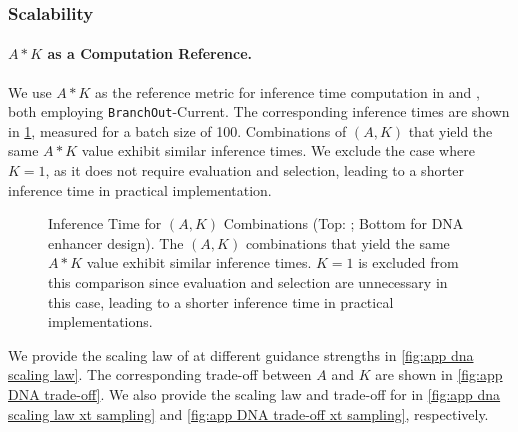 \subsubsection{Scalability}\label{app:scalability of DNA}
\paragraph{$A*K$ as a Computation Reference.} We use $A*K$ as the reference metric for inference time computation in \xtsampling and \xtgrad, both employing \texttt{BranchOut}-Current. The corresponding inference times are shown in \cref{fig:time with fixed AK}, measured for a batch size of 100. Combinations of $(A,K)$ that yield the same $A*K$ value exhibit similar inference times. We exclude the case where $K=1$, as it does not require evaluation and selection, leading to a shorter inference time in practical implementation.


\begin{figure}[ht]
    \centering
    \caption{Inference Time for $(A,K)$ Combinations (Top: \xtsampling; Bottom \xtgrad for DNA enhancer design). The $(A,K)$ combinations that yield the same $A*K$ value exhibit similar inference times. $K=1$ is excluded from this comparison since evaluation and selection are unnecessary in this case, leading to a shorter inference time in practical implementations.}
    \label{fig:time with fixed AK}
\end{figure}







We provide the scaling law of \xtgrad at different guidance strengths in \cref{fig:app dna scaling law}. The corresponding trade-off between $A$ and $K$ are shown in \cref{fig:app DNA trade-off}. We also provide the scaling law and trade-off for \xtsampling in \cref{fig:app dna scaling law xt sampling} and \cref{fig:app DNA trade-off xt sampling}, respectively. 



